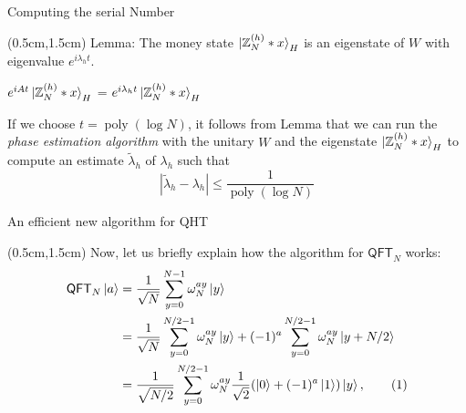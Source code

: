\documentclass{beamer}
\theoremstyle{definition}
\newcommand\numberthis{\addtocounter{equation}{1}\tag{\theequation}}
\newcommand{\qft}{\mathsf{QFT}}
\begin{document}
 
\begin{frame}{Computing the serial Number}

    \begin{textblock*}{12cm}(0.5cm,1.5cm)
        Lemma: The money state $\ket{\mathbb{Z}_N^{(h)} * x}_H$ is an eigenstate of $W$ with eigenvalue $e^{i\lambda_h t}$.
        \vspace{1cm}

        $e^{iAt} \ket{\mathbb{Z}_N^{(h)} * x}_H$ = $e^{i\lambda_{h}t} \ket{\mathbb{Z}_N^{(h)} * x}_H$
        
        \vspace{1cm}
        If we choose $t = \operatorname{poly}(\log N)$, it follows from Lemma that we can run the \textit{phase estimation algorithm} with the unitary $W$ and the eigenstate $\ket{\mathbb{Z}_N^{(h)} * x}_H$ to compute an estimate $\tilde{\lambda}_h$ of $\lambda_h$ such that %
        \[
        |\tilde{\lambda}_h - \lambda_h| \leq \frac{1}{\operatorname{poly}(\log N)}
        \]
        

        
    \end{textblock*}

 \end{frame}




\begin{frame}{An efficient new algorithm for QHT}
    
    \begin{textblock*}{12cm}(0.5cm,1.5cm)
        Now, let us briefly explain how the algorithm for $\qft_N$ works:
        \begin{align*}
            \qft_N\ket{a}
            & = \frac{1}{\sqrt{N}} \sum_{y = 0}^{N - 1} \omega_N^{ay}\ket{y} \\
            & = \frac{1}{\sqrt{N}} \sum_{y = 0}^{N / 2 - 1} \omega_N^{ay} \ket{y} + (-1)^a \sum_{y = 0}^{N / 2 - 1} \omega_N^{ay} \ket{y + N/2} \\
            & = \frac{1}{\sqrt{N / 2}} \sum_{y = 0}^{N / 2 - 1} \omega_N^{ay} \frac{1}{\sqrt{2}} (\ket{0} + (-1)^a \ket{1}) \ket{y}, \numberthis\label{eq:qft_alt}
        \end{align*}
       
    \end{textblock*}
    

\end{frame}
\end{document}
